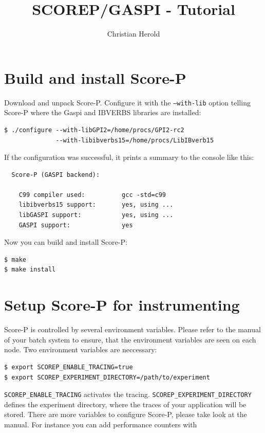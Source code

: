 \documentclass[plainarticle,german,final,hyperref,utf8]{article}
\author{Christian Herold}
\title{SCOREP/GASPI - Tutorial}
\newcommand{\GASPI}{{\sc Gaspi}}
\newcommand{\SCOREP}{{Score-P}}
\begin{document}
\section*{Build and install \SCOREP{}}

Download and unpack \SCOREP{}. 
Configure it with the {\tt --with-lib} option telling \SCOREP{} where the \GASPI{} and IBVERBS libraries are installed:

\begin{lstlisting}
$ ./configure --with-libGPI2=/home/procs/GPI2-rc2 
              --with-libibverbs15=/home/procs/LibIBverb15
\end{lstlisting}

If the configuration was successful, it prints a summary to the console like this:

\begin{lstlisting}
  Score-P (GASPI backend):

    C99 compiler used:          gcc -std=c99
    libibverbs15 support:       yes, using ...
    libGASPI support:           yes, using ...
    GASPI support:              yes
\end{lstlisting}

Now you can build and install \SCOREP{}:

\begin{lstlisting}
$ make
$ make install
\end{lstlisting}



\section*{Setup \SCOREP{} for instrumenting}

\SCOREP{} is controlled by several environment variables. 
Please refer to the manual of your batch system to ensure, that the environment variables are seen on each node.
Two environment variables are neccessary:

\begin{lstlisting}
$ export SCOREP_ENABLE_TRACING=true
$ export SCOREP_EXPERIMENT_DIRECTORY=/path/to/experiment
\end{lstlisting}

{\tt SCOREP\_ENABLE\_TRACING} activates the tracing.
{\tt SCOREP\_EXPERIMENT\_DIRECTORY} defines the experiment directory, where the traces of your application will be stored.
There are more variables to configure \SCOREP{}, please take look at the manual. 
For instance you can add performance counters with
\end{document}
